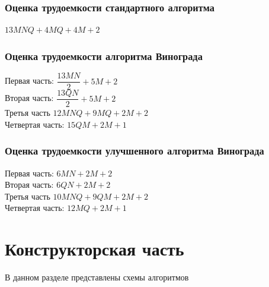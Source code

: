 \documentclass[12pt]{article}
\begin{document}
\subsubsection{Оценка трудоемкости стандартного алгоритма}
$13MNQ+4MQ+4M+2$
\subsubsection{Оценка трудоемкости алгоритма Винограда}
Первая часть: $\dfrac{13MN}{2}+5M+2$ \\
Вторая часть: $\dfrac{13QN}{2}+5M+2$ \\
Третья часть $12MNQ+9MQ+2M+2$ \\
Четвертая часть: $15QM+2M+1$ \\

\subsubsection{Оценка трудоемкости улучшенного алгоритма Винограда}
Первая часть: $6MN+2M+2$ \\
Вторая часть: $6QN+2M+2$ \\
Третья часть $10MNQ+9QM+2M+2$ \\
Четвертая часть: $12MQ + 2M + 1$ \\
\newpage
\section{Конструкторская часть}
В данном разделе представлены схемы алгоритмов 
\end{document}
